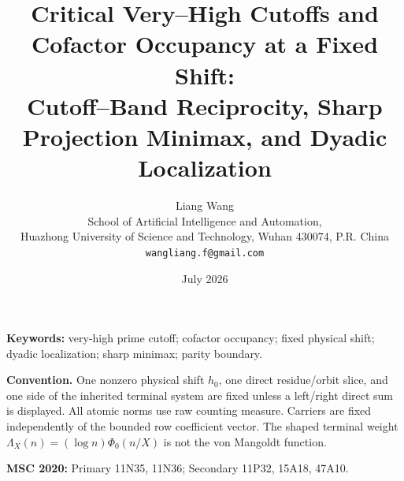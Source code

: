 \documentclass[11pt]{article}
\title{\bfseries Critical Very--High Cutoffs and Cofactor Occupancy at a Fixed Shift:\\
Cutoff--Band Reciprocity, Sharp Projection Minimax, and Dyadic Localization}
\author{Liang Wang\\
\small School of Artificial Intelligence and Automation,\\[-2pt]
\small Huazhong University of Science and Technology, Wuhan 430074, P.R. China\\
\small \texttt{wangliang.f@gmail.com}}
\date{July 2026}
\theoremstyle{definition}
\theoremstyle{remark}
\begin{document}
\maketitle



\noindent\textbf{Keywords:} very-high prime cutoff; cofactor occupancy;
fixed physical shift; dyadic localization; sharp minimax; parity boundary.

\medskip
\noindent\textbf{Convention.}
One nonzero physical shift \(h_0\), one direct residue/orbit slice, and one
side of the inherited terminal system are fixed unless a left/right direct
sum is displayed.  All atomic norms use raw counting measure.  Carriers are
fixed independently of the bounded row coefficient vector.  The shaped
terminal weight \(\Lambda_X(n)=(\log n)\Phi_0(n/X)\) is not the von Mangoldt
function.

\medskip
\noindent\textbf{MSC 2020:} Primary 11N35, 11N36; Secondary 11P32,
15A18, 47A10.









\begingroup
\raggedright


\endgroup
\end{document}
